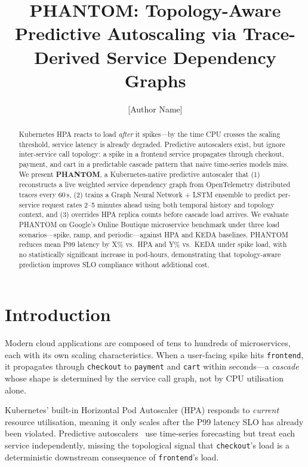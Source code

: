 \documentclass[sigconf,nonacm]{acmart}
\begin{document}
\title{PHANTOM: Topology-Aware Predictive Autoscaling via Trace-Derived Service Dependency Graphs}

\author{[Author Name]}

\begin{abstract}
Kubernetes HPA reacts to load \emph{after} it spikes---by the time CPU crosses the scaling threshold, service latency is already degraded.
Predictive autoscalers exist, but ignore inter-service call topology: a spike in a frontend service propagates through checkout, payment, and cart in a predictable cascade pattern that naive time-series models miss.
We present \textbf{PHANTOM}, a Kubernetes-native predictive autoscaler that (1) reconstructs a live weighted service dependency graph from OpenTelemetry distributed traces every 60\,s, (2) trains a Graph Neural Network + LSTM ensemble to predict per-service request rates 2--5 minutes ahead using both temporal history and topology context, and (3) overrides HPA replica counts before cascade load arrives.
We evaluate PHANTOM on Google's Online Boutique microservice benchmark under three load scenarios---spike, ramp, and periodic---against HPA and KEDA baselines.
PHANTOM reduces mean P99 latency by X\% vs.\ HPA and Y\% vs.\ KEDA under spike load, with no statistically significant increase in pod-hours, demonstrating that topology-aware prediction improves SLO compliance without additional cost.
\end{abstract}


\section{Introduction}

Modern cloud applications are composed of tens to hundreds of microservices, each with its own scaling characteristics.
When a user-facing spike hits \texttt{frontend}, it propagates through \texttt{checkout} to \texttt{payment} and \texttt{cart} within seconds---a \emph{cascade} whose shape is determined by the service call graph, not by CPU utilisation alone.

Kubernetes' built-in Horizontal Pod Autoscaler (HPA) responds to \emph{current} resource utilisation, meaning it only scales after the P99 latency SLO has already been violated.
Predictive autoscalers~\cite{keda,vpa} use time-series forecasting but treat each service independently, missing the topological signal that \texttt{checkout}'s load is a deterministic downstream consequence of \texttt{frontend}'s load.
\end{document}

